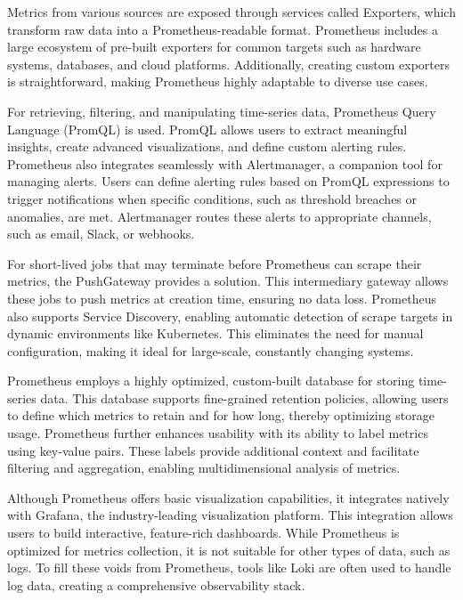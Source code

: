 Metrics from various sources are exposed through services called Exporters, which transform raw data into a Prometheus-readable format. Prometheus includes a large ecosystem of pre-built exporters for common targets such as hardware systems, databases, and cloud platforms. Additionally, creating custom exporters is straightforward, making Prometheus highly adaptable to diverse use cases.

For retrieving, filtering, and manipulating time-series data, Prometheus Query Language (PromQL) is used. PromQL allows users to extract meaningful insights, create advanced visualizations, and define custom alerting rules. Prometheus also integrates seamlessly with Alertmanager, a companion tool for managing alerts. Users can define alerting rules based on PromQL expressions to trigger notifications when specific conditions, such as threshold breaches or anomalies, are met. Alertmanager routes these alerts to appropriate channels, such as email, Slack, or webhooks.

For short-lived jobs that may terminate before Prometheus can scrape their metrics, the PushGateway provides a solution. This intermediary gateway allows these jobs to push metrics at creation time, ensuring no data loss. Prometheus also supports Service Discovery, enabling automatic detection of scrape targets in dynamic environments like Kubernetes. This eliminates the need for manual configuration, making it ideal for large-scale, constantly changing systems.

Prometheus employs a highly optimized, custom-built database for storing time-series data. This database supports fine-grained retention policies, allowing users to define which metrics to retain and for how long, thereby optimizing storage usage. Prometheus further enhances usability with its ability to label metrics using key-value pairs. These labels provide additional context and facilitate filtering and aggregation, enabling multidimensional analysis of metrics.

Although Prometheus offers basic visualization capabilities, it integrates natively with Grafana, the industry-leading visualization platform. This integration allows users to build interactive, feature-rich dashboards. While Prometheus is optimized for metrics collection, it is not suitable for other types of data, such as logs. To fill these voids from Prometheus, tools like Loki are often used to handle log data, creating a comprehensive observability stack.\cite{Jani2024-mg,Pragathi2024-fa}



